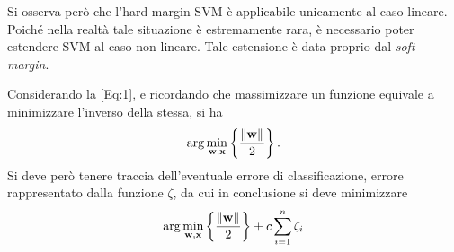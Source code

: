 \documentclass{subfiles}
\begin{document}
Si osserva però che l'hard margin SVM è applicabile unicamente al caso lineare.
Poiché nella realtà tale situazione è estremamente rara, è necessario poter estendere SVM al caso non lineare.
Tale estensione è data proprio dal \emph{soft margin}.

Considerando la \eqref{Eq:1}, e ricordando che massimizzare un funzione equivale a minimizzare l'inverso della stessa, si ha
$$
    \arg\Min*{\frac{\Norm{\VectorBold{w}}}{2}}[\VectorBold{w}, \VectorBold{x}].
$$
Si deve però tenere traccia dell'eventuale errore di classificazione, errore rappresentato dalla funzione $\zeta$,
da cui in conclusione si deve minimizzare
$$
    \arg\Min*{\frac{\Norm{\VectorBold{w}}}{2}}[\VectorBold{w}, \VectorBold{x}] + c \Sum{\zeta_{i}}{i = 1}[n]
$$
\end{document}
